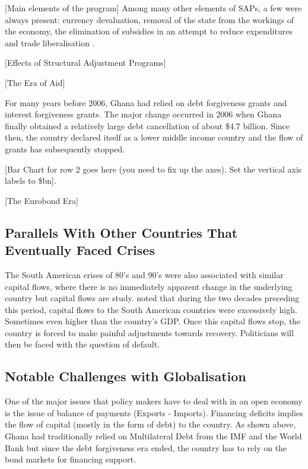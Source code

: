 \documentclass[a4paper, 12pt]{article}
\begin{document}
	[Main elements of the program]
	Among many other elements of SAPs, a few were always present: currency devaluation, removal of the state from the workings of the economy, the elimination of subsidies in an attempt to reduce expenditures and trade liberalisation \cite{ThingsFallAp}. 
	
	\cite{World}
	\cite{AssessingAdju}
	
	
	[Effects of Structural Adjustment Programs]
	\cite{StructuralAdj_1}
	\cite{StructuralAdj}
	\cite{okoroafo1993imf}
	\cite{Backtothefu}
	
	[The Era of Aid]
	\cite{tsikata1999aid}
	\cite{Foreignaidd}
	\cite{Tradeopenness}
	\cite{Riddell09}
	
	For many years before 2006, Ghana had relied on debt forgiveness grants and interest forgiveness grants. The major change occurred in 2006 when Ghana finally obtained a relatively large debt cancellation of about \$4.7 billion. Since then, the country declared itself as a lower middle income country and the flow of grants has subsequently stopped.
	
	[Bar Chart for row 2 goes here (you need to fix up the axes). Set the vertical axis labels to \$bn].
	
	
	[The Eurobond Era]
	
	\subsection{Parallels With Other Countries That Eventually Faced Crises}
	The South American crises of 80's and 90's were also associated with similar capital flows, where there is no immediately apparent change in the underlying country but capital flows are study.  noted that during the two decades preceding this period, capital flows to the South American countries were excessively high. Sometimes even higher than the country's GDP. Once this capital flows stop, the country is forced to make painful adjustments towards recovery. Politicians will then be faced with the question of default. 


	\subsection{Notable Challenges with Globalisation}
	
	One of the major issues that policy makers have to deal with in an open economy is the issue of balance of payments (Exports - Imports). Financing deficits implies the flow of capital (mostly in the form of debt) to the country. As shown above, Ghana had traditionally relied on Multilateral Debt from the IMF and the World Bank but since the debt forgiveness era ended, the country has to rely on the bond markets for financing support.
	
\end{document}

